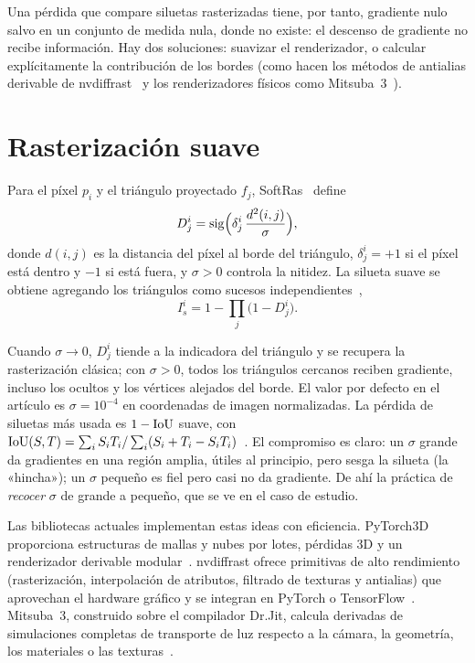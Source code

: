 Una pérdida que compare siluetas rasterizadas tiene, por tanto, gradiente nulo salvo en un conjunto de medida nula, donde no existe: el descenso de gradiente no recibe información. Hay dos soluciones: suavizar el renderizador, o calcular explícitamente la contribución de los bordes (como hacen los métodos de antialias derivable de nvdiffrast~\cite{nvdiffrast} y los renderizadores físicos como Mitsuba~3~\cite{mitsuba3}).

\section{Rasterización suave}

\begin{definicion}\label{def:softras}
Para el píxel $p_i$ y el triángulo proyectado $f_j$, SoftRas~\cite[§3.2]{softras} define
\[
D_j^i=\operatorname{sig}\Bigl(\delta_j^i\,\frac{d^2(i,j)}{\sigma}\Bigr),
\]
donde $d(i,j)$ es la distancia del píxel al borde del triángulo, $\delta_j^i=+1$ si el píxel está dentro y $-1$ si está fuera, y $\sigma>0$ controla la nitidez. La silueta suave se obtiene agregando los triángulos como sucesos independientes~\cite[§3.3]{softras},
\[
I_s^i=1-\prod_j\bigl(1-D_j^i\bigr).
\]
\end{definicion}

Cuando $\sigma\to 0$, $D_j^i$ tiende a la indicadora del triángulo y se recupera la rasterización clásica; con $\sigma>0$, todos los triángulos cercanos reciben gradiente, incluso los ocultos y los vértices alejados del borde. El valor por defecto en el artículo es $\sigma=10^{-4}$ en coordenadas de imagen normalizadas. La pérdida de siluetas más usada es $1-\operatorname{IoU}$ suave, con $\operatorname{IoU}(S,T)=\sum_iS_iT_i/\sum_i(S_i+T_i-S_iT_i)$~\cite[§4.1]{softras}. El compromiso es claro: un $\sigma$ grande da gradientes en una región amplia, útiles al principio, pero sesga la silueta (la «hincha»); un $\sigma$ pequeño es fiel pero casi no da gradiente. De ahí la práctica de \emph{recocer} $\sigma$ de grande a pequeño, que se ve en el caso de estudio.

Las bibliotecas actuales implementan estas ideas con eficiencia. PyTorch3D proporciona estructuras de mallas y nubes por lotes, pérdidas 3D y un renderizador derivable modular~\cite{pytorch3d}. nvdiffrast ofrece primitivas de alto rendimiento (rasterización, interpolación de atributos, filtrado de texturas y antialias) que aprovechan el hardware gráfico y se integran en PyTorch o TensorFlow~\cite{nvdiffrast}. Mitsuba~3, construido sobre el compilador Dr.Jit, calcula derivadas de simulaciones completas de transporte de luz respecto a la cámara, la geometría, los materiales o las texturas~\cite{mitsuba3}.


